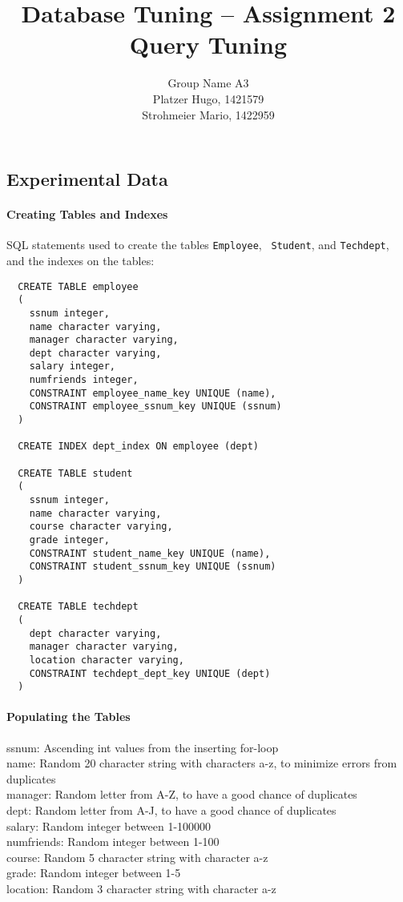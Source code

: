 \documentclass[11pt]{scrartcl}
\title{
  \textbf{\large Database Tuning -- Assignment 2}\\
  Query Tuning
}
\author{
 Group Name A3\\
 \large Platzer Hugo, 1421579 \\
 \large Strohmeier Mario, 1422959
}
\begin{document}
\maketitle

\subsection*{Experimental Data}

\paragraph{Creating Tables and Indexes}

SQL statements used to create the tables {\tt Employee}, {\tt
  Student}, and {\tt Techdept}, and the indexes on the tables:

{\small
\begin{verbatim}
  CREATE TABLE employee
  (
    ssnum integer,
    name character varying,
    manager character varying,
    dept character varying,
    salary integer,
    numfriends integer,
    CONSTRAINT employee_name_key UNIQUE (name),
    CONSTRAINT employee_ssnum_key UNIQUE (ssnum)
  )

  CREATE INDEX dept_index ON employee (dept)

  CREATE TABLE student
  (
    ssnum integer,
    name character varying,
    course character varying,
    grade integer,
    CONSTRAINT student_name_key UNIQUE (name),
    CONSTRAINT student_ssnum_key UNIQUE (ssnum)
  )

  CREATE TABLE techdept
  (
    dept character varying,
    manager character varying,
    location character varying,
    CONSTRAINT techdept_dept_key UNIQUE (dept)
  )
\end{verbatim}
}

\paragraph{Populating the Tables}

ssnum: Ascending int values from the inserting for-loop\\
name: Random 20 character string with characters a-z, to minimize errors from duplicates\\
manager: Random letter from A-Z, to have a good chance of duplicates\\
dept: Random letter from A-J, to have a good chance of duplicates\\
salary: Random integer between 1-100000\\
numfriends: Random integer between 1-100\\
course: Random 5 character string with character a-z\\
grade: Random integer between 1-5\\
location: Random 3 character string with character a-z\\
\end{document}

